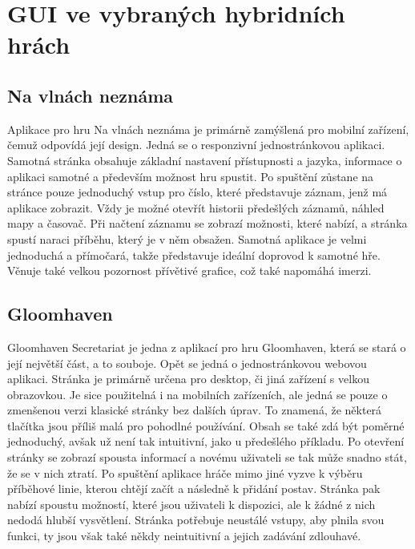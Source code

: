 
\section{GUI ve vybraných hybridních hrách}

\subsection{Na vlnách neznáma}
Aplikace pro hru Na vlnách neznáma je primárně zamýšlená pro mobilní zařízení, čemuž odpovídá její design. Jedná se o responzivní jednostránkovou aplikaci. Samotná stránka obsahuje základní nastavení přístupnosti a jazyka, informace o aplikaci samotné a především možnost hru spustit. Po spuštění zůstane na stránce pouze jednoduchý vstup pro číslo, které představuje záznam, jenž má aplikace zobrazit. Vždy je možné otevřít historii předešlých záznamů, náhled mapy a časovač. Při načtení záznamu se zobrazí možnosti, které nabízí, a stránka spustí naraci příběhu, který je v něm obsažen. Samotná aplikace je velmi jednoduchá a přímočará, takže představuje ideální doprovod k samotné hře. Věnuje také velkou pozornost přívětivé grafice, což také napomáhá imerzi.


\subsection{Gloomhaven}
Gloomhaven Secretariat je jedna z aplikací pro hru Gloomhaven, která se stará o její největší část, a to souboje. Opět se jedná o jednostránkovou webovou aplikaci. Stránka je primárně určena pro desktop, či jiná zařízení s velkou obrazovkou. Je sice použitelná i na mobilních zařízeních, ale jedná se pouze o zmenšenou verzi klasické stránky bez dalších úprav. To znamená, že některá tlačítka jsou příliš malá pro pohodlné používání. Obsah se také zdá být poměrné jednoduchý, avšak už není tak intuitivní, jako u předešlého příkladu. Po otevření stránky se zobrazí spousta informací a novému uživateli se tak může snadno stát, že se v nich ztratí. Po spuštění aplikace hráče mimo jiné vyzve k výběru příběhové linie, kterou chtějí začít a následně k přidání postav. Stránka pak nabízí spoustu možností, které jsou uživateli k dispozici, ale k žádné z nich nedodá hlubší vysvětlení. Stránka potřebuje neustálé vstupy, aby plnila svou funkci, ty jsou však také někdy neintuitivní a jejich zadávání zdlouhavé.

